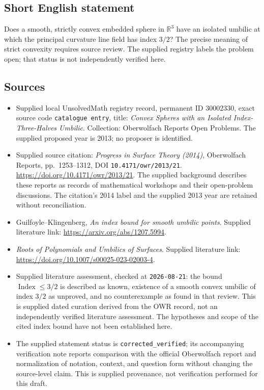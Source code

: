 \documentclass[11pt]{article}
\newcommand{\R}{\mathbb{R}}
\begin{document}
\subsection{Short English statement}
Does a smooth, strictly convex embedded sphere in \(\R^3\) have an isolated umbilic at which the principal curvature line field has index \(3/2\)? The precise meaning of strict convexity requires source review. The supplied registry labels the problem open; that status is not independently verified here.
\subsection{Sources}
\begin{itemize}
\item Supplied local UnsolvedMath registry record, permanent ID \(30002330\), exact source code \texttt{catalogue entry}, title: \emph{Convex Spheres with an Isolated Index-Three-Halves Umbilic}. Collection: Oberwolfach Reports Open Problems. The supplied proposed year is 2013; no proposer is identified.
\item Supplied source citation: \emph{Progress in Surface Theory (2014)}, Oberwolfach Reports, pp.\ 1253--1312, DOI \texttt{10.4171/owr/2013/21}. \url{https://doi.org/10.4171/owr/2013/21}. The supplied background describes these reports as records of mathematical workshops and their open-problem discussions. The citation's 2014 label and the supplied 2013 year are retained without reconciliation.
\item Guilfoyle--Klingenberg, \emph{An index bound for smooth umbilic points}. Supplied literature link: \url{https://arxiv.org/abs/1207.5994}.
\item \emph{Roots of Polynomials and Umbilics of Surfaces}. Supplied literature link: \url{https://doi.org/10.1007/s00025-023-02003-4}.
\item Supplied literature assessment, checked at \texttt{2026-08-21}: the bound \(\operatorname{Index}\leq 3/2\) is described as known, existence of a smooth convex umbilic of index \(3/2\) as unproved, and no counterexample as found in that review. This is supplied dated curation derived from the OWR record, not an independently verified literature assessment. The hypotheses and scope of the cited index bound have not been established here.
\item The supplied statement status is \texttt{corrected\_verified}; its accompanying verification note reports comparison with the official Oberwolfach report and normalization of notation, context, and question form without changing the source-level claim. This is supplied provenance, not verification performed for this draft.
\end{itemize}
\end{document}
